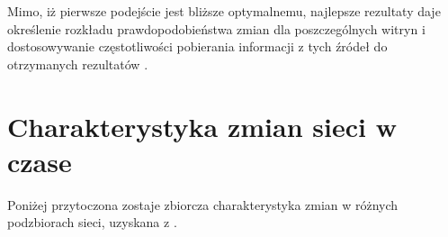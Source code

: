 Mimo, iż pierwsze podejście jest bliższe optymalnemu, najlepsze rezultaty daje określenie rozkładu prawdopodobieństwa zmian dla poszczególnych witryn i 
dostosowywanie częstotliwości pobierania informacji z tych źródeł do otrzymanych rezultatów \cite{webCrawling}.


\section{Charakterystyka zmian sieci w czase}
\label{sec:zmianySieci}

Poniżej przytoczona zostaje zbiorcza charakterystyka zmian w różnych podzbiorach sieci, uzyskana z \cite{webCrawling}.

